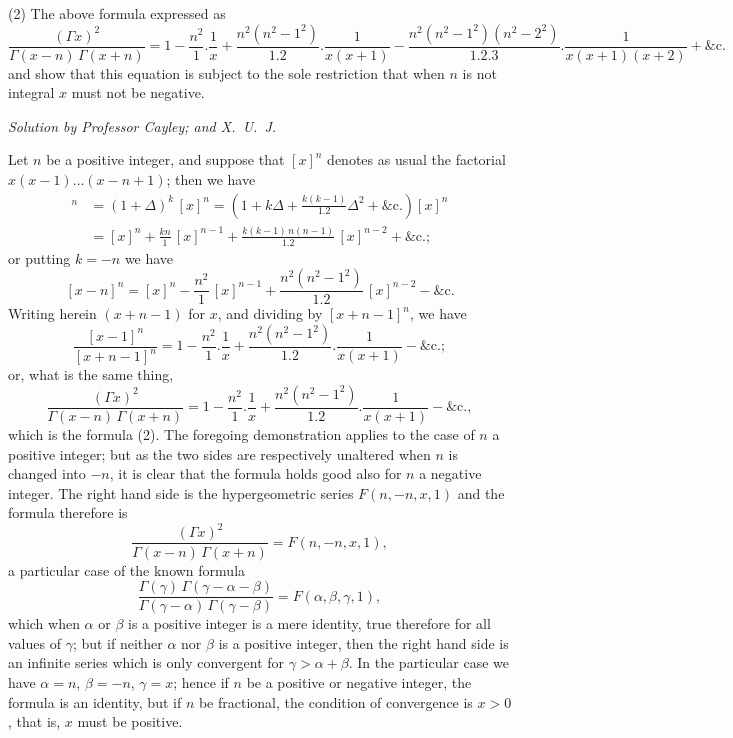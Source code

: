 \documentclass[11pt,a4paper]{article}
\begin{document}
(2) The above formula expressed as
\[
\frac{(\Gamma x)^2}{\Gamma(x-n)\,\Gamma(x+n)} = 1 - \frac{n^2}{1}.\frac{1}{x} + \frac{n^2(n^2-1^2)}{1.2}.\frac{1}{x(x+1)} - \frac{n^2(n^2-1^2)(n^2-2^2)}{1.2.3}.\frac{1}{x(x+1)(x+2)} + \&\text{c.}
\]
and show that this equation is subject to the sole restriction that when $n$ is not
integral $x$ must not be negative.

\begin{center}
\textit{Solution by Professor Cayley; and X.~U.~J.}
\end{center}

Let $n$ be a positive integer, and suppose that $[x]^n$ denotes as usual the factorial
$x(x-1)\ldots(x-n+1)$; then we have
\begin{align*}
[x+k]^n &= (1+\Delta)^k\,[x]^n = \left(1 + k\Delta + \frac{k(k-1)}{1.2}\Delta^2 + \&\text{c.}\right)[x]^n\\
&= [x]^n + \frac{kn}{1}\,[x]^{n-1} + \frac{k(k-1)\,n(n-1)}{1.2}\,[x]^{n-2} + \&\text{c.};
\end{align*}
or putting $k=-n$ we have
\[
[x-n]^n = [x]^n - \frac{n^2}{1}\,[x]^{n-1} + \frac{n^2(n^2-1^2)}{1.2}\,[x]^{n-2} - \&\text{c.}
\]
Writing herein $(x+n-1)$ for $x$, and dividing by $[x+n-1]^n$, we have
\[
\frac{[x-1]^n}{[x+n-1]^n} = 1 - \frac{n^2}{1}.\frac{1}{x} + \frac{n^2(n^2-1^2)}{1.2}.\frac{1}{x(x+1)} - \&\text{c.};
\]
or, what is the same thing,
\[
\frac{(\Gamma x)^2}{\Gamma(x-n)\,\Gamma(x+n)} = 1 - \frac{n^2}{1}.\frac{1}{x} + \frac{n^2(n^2-1^2)}{1.2}.\frac{1}{x(x+1)} - \&\text{c.},
\]
which is the formula (2). The foregoing demonstration applies to the case of $n$ a
positive integer; but as the two sides are respectively unaltered when $n$ is changed
into $-n$, it is clear that the formula holds good also for $n$ a negative integer. The
right hand side is the hypergeometric series $F(n, -n, x, 1)$ and the formula therefore is
\[
\frac{(\Gamma x)^2}{\Gamma(x-n)\,\Gamma(x+n)} = F(n, -n, x, 1),
\]
a particular case of the known formula
\[
\frac{\Gamma(\gamma)\,\Gamma(\gamma-\alpha-\beta)}{\Gamma(\gamma-\alpha)\,\Gamma(\gamma-\beta)} = F(\alpha, \beta, \gamma, 1),
\]
which when $\alpha$ or $\beta$ is a positive integer is a mere identity, true therefore for all
values of $\gamma$; but if neither $\alpha$ nor $\beta$ is a positive integer, then the right hand side
is an infinite series which is only convergent for $\gamma > \alpha + \beta$. In the particular case we
have $\alpha=n$, $\beta=-n$, $\gamma=x$; hence if $n$ be a positive or negative integer, the formula
is an identity, but if $n$ be fractional, the condition of convergence is $x > 0$, that is,
$x$ must be positive.
\end{document}
